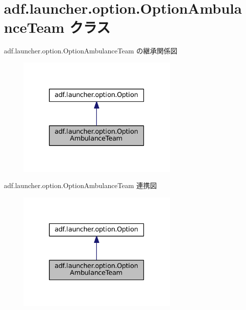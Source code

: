 \hypertarget{classadf_1_1launcher_1_1option_1_1OptionAmbulanceTeam}{}\section{adf.\+launcher.\+option.\+Option\+Ambulance\+Team クラス}
\label{classadf_1_1launcher_1_1option_1_1OptionAmbulanceTeam}


adf.\+launcher.\+option.\+Option\+Ambulance\+Team の継承関係図
\nopagebreak
\begin{figure}[H]
\begin{center}
\leavevmode
\includegraphics[width=225pt]{classadf_1_1launcher_1_1option_1_1OptionAmbulanceTeam__inherit__graph}
\end{center}
\end{figure}


adf.\+launcher.\+option.\+Option\+Ambulance\+Team 連携図
\nopagebreak
\begin{figure}[H]
\begin{center}
\leavevmode
\includegraphics[width=225pt]{classadf_1_1launcher_1_1option_1_1OptionAmbulanceTeam__coll__graph}
\end{center}
\end{figure}
